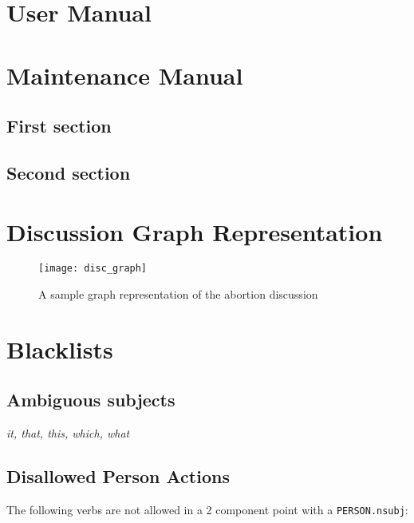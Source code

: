 \begin{appendices}
    \makeatletter
    \makeatother

    \chapter{User Manual}
      


    \chapter{Maintenance Manual\label{app:maintain}}
      \section{First section}
      \section{Second section}

    \chapter{Discussion Graph Representation\label{app:disc_graph}}
      \begin{figure}[h]
        \centering
        \texttt{[image: disc\_graph]}
        \caption{A sample graph representation of the abortion discussion}
      \end{figure}

    \chapter{Blacklists\label{app:blacklists}}
      \section{Ambiguous subjects}
        \textit{it, that, this, which, what}

      \section{Disallowed Person Actions}
        The following verbs are not allowed in a 2 component point with a \texttt{PERSON.nsubj}:


\end{appendices}
